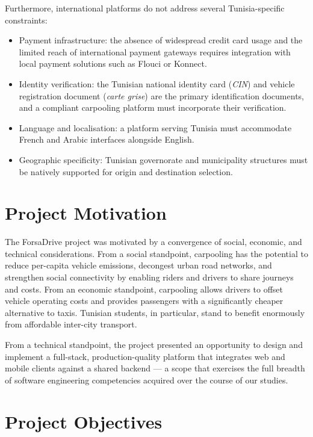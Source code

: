 \documentclass[12pt,a4paper,openright]{report}
\begin{document}
Furthermore, international platforms do not address several Tunisia-specific constraints:
\begin{itemize}[noitemsep]
    \item Payment infrastructure: the absence of widespread credit card usage and the limited reach of international payment gateways requires integration with local payment solutions such as Flouci or Konnect.
    \item Identity verification: the Tunisian national identity card (\textit{CIN}) and vehicle registration document (\textit{carte grise}) are the primary identification documents, and a compliant carpooling platform must incorporate their verification.
    \item Language and localisation: a platform serving Tunisia must accommodate French and Arabic interfaces alongside English.
    \item Geographic specificity: Tunisian governorate and municipality structures must be natively supported for origin and destination selection.
\end{itemize}

\section{Project Motivation}

The ForsaDrive project was motivated by a convergence of social, economic, and technical considerations. From a social standpoint, carpooling has the potential to reduce per-capita vehicle emissions, decongest urban road networks, and strengthen social connectivity by enabling riders and drivers to share journeys and costs. From an economic standpoint, carpooling allows drivers to offset vehicle operating costs and provides passengers with a significantly cheaper alternative to taxis. Tunisian students, in particular, stand to benefit enormously from affordable inter-city transport.

From a technical standpoint, the project presented an opportunity to design and implement a full-stack, production-quality platform that integrates web and mobile clients against a shared backend --- a scope that exercises the full breadth of software engineering competencies acquired over the course of our studies.

\section{Project Objectives}
\end{document}
